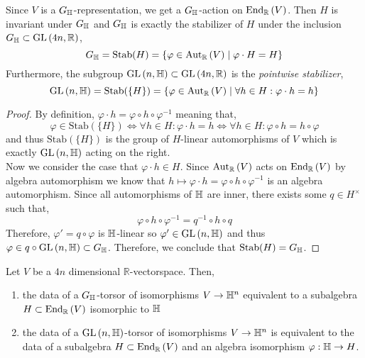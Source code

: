 \documentclass[12pt]{extarticle}
\newcommand{\R}{\mathbb{R}}
\begin{document}
\begin{lemma}
Since $V$ is a $G_{\mathbb{H}}$-representation, we get a $G_{\mathbb{H}}$-action on $\End{\R}{V}$. Then $H$ is invariant under $G_{\mathbb{H}}$ and $G_{\mathbb{H}}$ is exactly the stabilizer of $H$ under the inclusion $G_{\H} \subset \GL{4n, \R}$,
\[ G_{\H} = \mathrm{Stab}(H) = \{ \varphi \in \Aut{\R}{V} \mid \varphi \cdot H = H \} \]
Furthermore, the subgroup $\GL{n, \H} \subset \GL{4n, \R}$ is the \textit{pointwise stabilizer},
\[ \GL{n, \H} = \mathrm{Stab}(\{ H \}) = \{ \varphi \in \Aut{\R}{V} \mid \forall h \in H : \varphi \cdot h = h \} \]
\end{lemma}

\begin{proof}
By definition, $\varphi \cdot h = \varphi \circ h \circ \varphi^{-1}$ meaning that,
\[ \varphi \in \mathrm{Stab}(\{ H \}) \iff \forall h  \in H : \varphi \cdot h = h \iff \forall h \in H : \varphi \circ h = h \circ \varphi \]
and thus $\mathrm{Stab}(\{ H \})$ is the group of $H$-linear automorphisms of $V$ which is exactly $\mathrm{GL}\left(n, \mathbb{H} \right)$ acting on the right.
\bigskip\\
Now we consider the case that $\varphi \cdot h \in H$. Since $\Aut{\R}{V}$ acts on $\End{\R}{V}$ by algebra automorphism we know that $h \mapsto \varphi \cdot h = \varphi \circ h \circ \varphi^{-1}$ is an algebra automorphism. Since all automorphisms of $\mathbb{H}$ are inner, there exists some $q \in H^\times$ such that,
\[ \varphi \circ h \circ \varphi^{-1} = q^{-1} \circ h \circ q \]
Therefore, $\varphi' = q \circ \varphi$ is $\mathbb{H}$-linear so $\varphi' \in \mathrm{GL}\left(n, \mathbb{H} \right)$ and thus $\varphi \in q \circ \mathrm{GL}\left(n, \mathbb{H} \right) \subset G_{\mathbb{H}}$. Therefore, we conclude that $\mathrm{Stab}(H) = G_{\mathbb{H}}$.
\end{proof}

\begin{prop}
Let $V$ be a $4n$ dimensional $\R$-vectorspace. Then,
\begin{enumerate}
\item the data of a $G_{\mathbb{H}}$-torsor of isomorphisms $V \to \mathbb{H}^n$ equivalent to a subalgebra $H \subset \End{\R}{V}$ isomorphic to $\mathbb{H}$
\item the data of a $\mathrm{GL}\left(n, \mathbb{H} \right)$-torsor of isomorphisms $V \to \mathbb{H}^n$ is equivalent to the data of a subalgebra $H \subset \End{\R}{V}$ and an algebra isomorphism $\varphi : \mathbb{H} \to H$.
\end{enumerate}
\end{prop}
\end{document}
